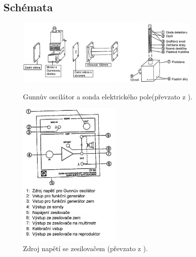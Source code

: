 \documentclass[english]{article}
\begin{document}
\subsection{Schémata}
	\begin{figure}[h!]
	\centering
	\begin{minipage}{.55\textwidth}
	  \centering
				\includegraphics[width=9cm]{att/gunnuv_oscilator_sonda.pdf}
				\caption{Gunnův oscilátor a sonda elektrického pole\newline (převzato z  \cite{bib:zadani}).}
				\label{fig:gunnuv_oscilator_sonda}
	\end{minipage}%
	\hfill
	\begin{minipage}{.35\textwidth}
	  \centering
				\includegraphics[width=5cm]{att/zdroj_napeti_se_zesilovacem.jpg}
				\caption{Zdroj napětí se zesilovačem (převzato z  \cite{bib:zadani}).}
				\label{fig:zdroj_napeti_se_zesilovacem}
	\end{minipage}
	\end{figure}
	
\end{document}
